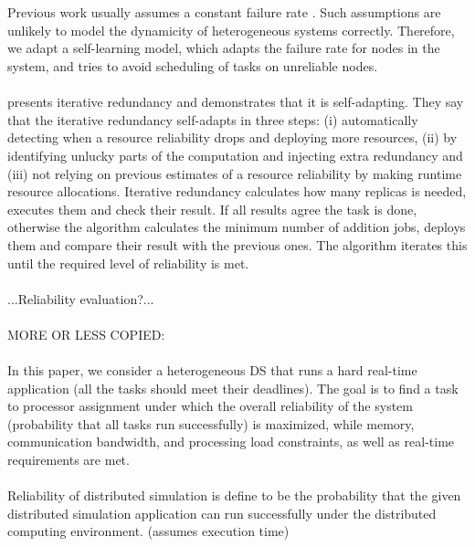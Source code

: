 \documentclass{cslthse-msc}
\begin{document}
\\\\
Previous work usually assumes a constant failure rate \cite{algoMaxRelEndToEndConstraint} \cite{algoMinExTime} \cite{relModelDistSimSystem} \cite{optTaskAllocationForMaxRel} \cite{perfImplPerCheckPoint}. Such assumptions are unlikely to model the dynamicity of heterogeneous systems correctly. Therefore, we adapt a self-learning model, which adapts the failure rate for nodes in the system, and tries to avoid scheduling of tasks on unreliable nodes.
\\\\
\cite{selfAdaptRel} presents iterative redundancy and demonstrates that it is self-adapting. They say that the iterative redundancy self-adapts in three steps: (i) automatically detecting when a resource reliability drops and deploying more resources, (ii) by identifying unlucky parts of the computation and injecting extra redundancy and (iii) not relying on previous estimates of a resource reliability by making runtime resource allocations. Iterative redundancy calculates how many replicas is needed, executes them and check their result. If all results agree the task is done, otherwise the algorithm calculates the minimum number of addition jobs, deploys them and compare their result with the previous ones. The algorithm iterates this until the required level of reliability is met.
\\\\
...Reliability evaluation?...
\\\\
MORE OR LESS COPIED:
\\\\
In this paper, we consider a heterogeneous DS that runs a hard real-time application (all the tasks should meet their deadlines). The goal is to find a task to processor assignment under which the overall reliability of the system (probability that all tasks run successfully) is maximized, while memory, communication bandwidth, and processing load constraints, as well as real-time requirements are met. \cite{optTaskAllocationForMaxRel}
\\\\
Reliability of distributed simulation is define to be the probability that the given distributed simulation application can run successfully under the distributed computing environment. (assumes execution time) \cite{relModelDistSimSystem}
\\\\
\end{document}
